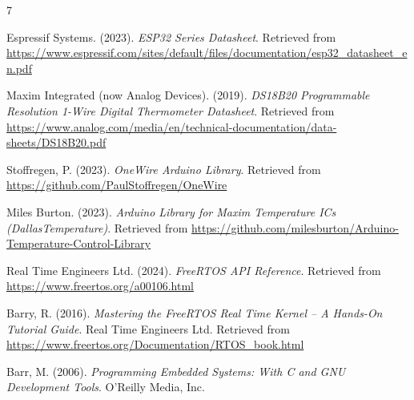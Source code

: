 \begin{thebibliography}{7}

    Espressif Systems. (2023). \textit{ESP32 Series Datasheet}.
    Retrieved from \url{https://www.espressif.com/sites/default/files/documentation/esp32_datasheet_en.pdf}

    Maxim Integrated (now Analog Devices). (2019). \textit{DS18B20 Programmable Resolution
    1-Wire Digital Thermometer Datasheet}.
    Retrieved from \url{https://www.analog.com/media/en/technical-documentation/data-sheets/DS18B20.pdf}

    Stoffregen, P. (2023). \textit{OneWire Arduino Library}.
    Retrieved from \url{https://github.com/PaulStoffregen/OneWire}

    Miles Burton. (2023). \textit{Arduino Library for Maxim Temperature ICs (DallasTemperature)}.
    Retrieved from \url{https://github.com/milesburton/Arduino-Temperature-Control-Library}

    Real Time Engineers Ltd. (2024). \textit{FreeRTOS API Reference}.
    Retrieved from \url{https://www.freertos.org/a00106.html}

    Barry, R. (2016). \textit{Mastering the FreeRTOS Real Time Kernel -- A Hands-On Tutorial Guide}.
    Real Time Engineers Ltd.
    Retrieved from \url{https://www.freertos.org/Documentation/RTOS_book.html}

    Barr, M. (2006). \textit{Programming Embedded Systems: With C and GNU Development Tools}.
    O'Reilly Media, Inc.

\end{thebibliography}

